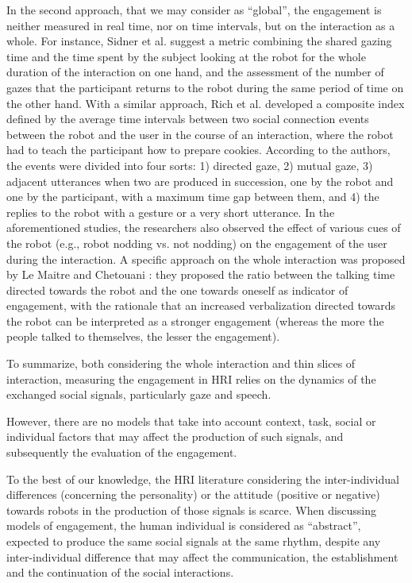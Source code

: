 In the second approach, that we may consider as ``global'', the engagement is neither measured in real time, nor on time intervals, but on the interaction as a whole. 
For instance, Sidner et al. \cite{sidner2004,sidner2005} suggest a metric combining the shared gazing time and the time spent by the subject looking at the robot for the whole duration of the interaction on one hand, and the assessment of the number of gazes that the participant returns to the robot during the same period of time on the other hand. 
With a similar approach, Rich et al. \cite{rich2010recognizing} developed a composite index defined by the average time intervals between two social connection events between the robot and the user in the course of an interaction, where the robot had to teach the participant how to prepare cookies. According to the authors, the events were divided into four sorts: 1) directed gaze, 2) mutual gaze, 3) adjacent utterances when two are produced in succession, one by the robot and one by the participant, with a maximum time gap between them, and 4) the replies to the robot with a gesture or a very short utterance. 
In the aforementioned studies, the researchers also observed the effect of various cues of the robot (e.g., robot nodding vs. not nodding) on the engagement of the user during the interaction.
A specific approach on the whole interaction was proposed by Le Maitre and Chetouani \cite{Lemaitre2013}: they proposed the ratio between the talking time directed towards the robot and the one towards oneself as indicator of engagement, with the rationale that an increased verbalization directed towards the robot can be interpreted as a stronger engagement (whereas the more the people talked to themselves, the lesser the engagement). 

To summarize, both considering the whole interaction and thin slices of interaction, measuring the engagement in HRI relies on the dynamics of the exchanged social signals, particularly gaze and speech.

However, there are no models that take into account context, task, social or individual factors that may affect the production of such signals, and subsequently the evaluation of the engagement. 

To the best of our knowledge, the HRI literature considering the inter-individual differences (concerning the personality) or the attitude (positive or negative) towards robots in the production of those signals is scarce. 
When discussing models of engagement, the human individual is considered as ``abstract'', expected to produce the same social signals at the same rhythm, despite any inter-individual difference that may affect the communication, the establishment and the continuation of the social interactions. 

